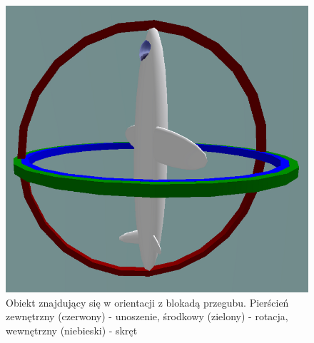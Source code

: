 \begin{figure}[!htb]
	\centering
	\includegraphics[width=0.6\linewidth]{images/GimbalLock.png}
	\caption[Obiekt znajdujący się w orientacji z blokadą przegubu]{Obiekt znajdujący się w orientacji z blokadą przegubu. Pierścień zewnętrzny (czerwony) - unoszenie, środkowy (zielony) - rotacja, wewnętrzny (niebieski) - skręt}
	\label{fig:rot:euler:gimbal}
\end{figure}

																													
